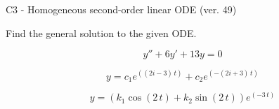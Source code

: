 \begin{exercise}
  \begin{exerciseTitle}C3 - Homogeneous second-order linear ODE (ver. 49)\end{exerciseTitle}
  \begin{exerciseStatement}
    
Find the general solution to the given ODE.

    
\[y''+6y'+13y = 0\]

  \end{exerciseStatement}
  \begin{exerciseAnswer}
    
\[y= c_{1} e^{\left(\left(2 i - 3\right) \, t\right)} + c_{2} e^{\left(-\left(2 i + 3\right) \, t\right)}\]

    
\[y= {\left(k_{1} \cos\left(2 \, t\right) + k_{2} \sin\left(2 \, t\right)\right)} e^{\left(-3 \, t\right)}\]

  \end{exerciseAnswer}
\end{exercise}